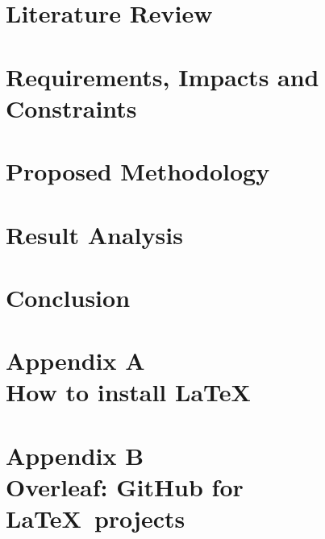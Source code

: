 \documentclass[12pt,oneside,openany]{report}
\begin{document}
\chapter{Literature Review}
\chapter{Requirements, Impacts and Constraints}
\chapter{Proposed Methodology}
\chapter{Result Analysis}
\chapter{Conclusion}

\chapter*{Appendix A\\How to install \LaTeX}

\chapter*{Appendix B\\Overleaf: GitHub for \LaTeX\ projects}

\end{document}
